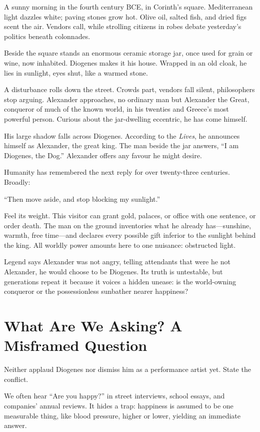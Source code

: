 A sunny morning in the fourth century BCE, in Corinth's square. Mediterranean light dazzles white; paving stones grow hot. Olive oil, salted fish, and dried figs scent the air. Vendors call, while strolling citizens in robes debate yesterday's politics beneath colonnades.

Beside the square stands an enormous ceramic storage jar, once used for grain or wine, now inhabited. Diogenes makes it his house. Wrapped in an old cloak, he lies in sunlight, eyes shut, like a warmed stone.

A disturbance rolls down the street. Crowds part, vendors fall silent, philosophers stop arguing. Alexander approaches, no ordinary man but Alexander the Great, conqueror of much of the known world, in his twenties and Greece's most powerful person. Curious about the jar-dwelling eccentric, he has come himself.

His large shadow falls across Diogenes. According to the \textit{Lives}, he announces himself as Alexander, the great king. The man beside the jar answers, ``I am Diogenes, the Dog.'' Alexander offers any favour he might desire.

Humanity has remembered the next reply for over twenty-three centuries. Broadly:

``Then move aside, and stop blocking my sunlight.''

Feel its weight. This visitor can grant gold, palaces, or office with one sentence, or order death. The man on the ground inventories what he already has---sunshine, warmth, free time---and declares every possible gift inferior to the sunlight behind the king. All worldly power amounts here to one nuisance: obstructed light.

Legend says Alexander was not angry, telling attendants that were he not Alexander, he would choose to be Diogenes. Its truth is untestable, but generations repeat it because it voices a hidden unease: is the world-owning conqueror or the possessionless sunbather nearer happiness?

\section{What Are We Asking? A Misframed Question}
Neither applaud Diogenes nor dismiss him as a performance artist yet. State the conflict.

We often hear ``Are you happy?'' in street interviews, school essays, and companies' annual reviews. It hides a trap: happiness is assumed to be one measurable thing, like blood pressure, higher or lower, yielding an immediate answer.

